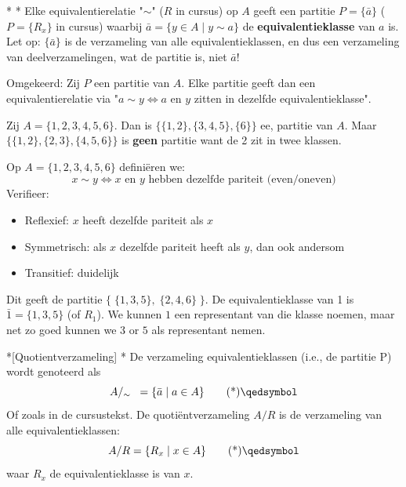 
\begin{nicetheorem}* \label{theorem:ER_naar_E_klassen}
    \nextpart[]*
    Elke equivalentierelatie "$\sim$" ($R$ in cursus) op $A$ geeft een partitie $P=\{\bar{a}\}$ ($P=\{R_x\}$ in cursus) waarbij $\bar{a} = \{y \in A \mid y \sim a\}$ de \textcolor{red!66!black}{\textbf{equivalentieklasse}} van $a$ is. Let op: $\{\bar{a}\}$ is de verzameling van alle equivalentieklassen, en dus een verzameling van deelverzamelingen, wat de partitie is, niet $\bar{a}$!
    
    \vspace{0.5cm}

    Omgekeerd: Zij $P$ een partitie van $A$. Elke partitie geeft dan een equivalentierelatie via "$a \sim y \Leftrightarrow a$ en $y$ zitten in dezelfde equivalentieklasse".
\end{nicetheorem}

\textbf{} Zij $A = \{1,2,3,4,5,6\}$. Dan is $\{\{1, 2\}, \{3,4,5\}, \{6\}\}$ ee, partitie van $A$. Maar \newline $\{\{1,2\}, \{2,3\}, \{4,5,6\}\}$ is \textbf{geen} partitie want de 2 zit in twee klassen.

\textbf{} Op $A = \{1,2,3,4,5,6\}$ definiëren we:
\begin{equation*}
    x \sim y \Leftrightarrow x \text{ en } y \text{ hebben dezelfde pariteit (even/oneven)}
\end{equation*}
Verifieer:
\begin{itemize}
    \item Reflexief: $x$ heeft dezelfde pariteit als $x$  
    \item Symmetrisch: als $x$ dezelfde pariteit heeft als $y$, dan ook andersom 
    \item Transitief: duidelijk 
\end{itemize}
Dit geeft de partitie $\{\;\{1,3,5\}, \;\{2,4,6\}\;\}$. De equivalentieklasse van 1 is $\bar{1} = \{1,3,5\}$ (of $R_1$). We kunnen $1$ een representant van die klasse noemen, maar net zo goed kunnen we $3$ or $5$ als representant nemen.


\begin{nicedefinition}*[Quotientverzameling]
    \nextpart[]*
    De verzameling equivalentieklassen (i.e., de partitie P) wordt genoteerd als
    \begin{equation}
        A/_{\sim} \;\;= \{\bar{a} \mid a \in A\} \qedtag
    \end{equation}
    Of zoals in de cursustekst. De quotiëntverzameling $A/R$ is de verzameling van alle equivalentieklassen:
    \begin{equation}
        A/R = \{R_x \mid x \in A\} \qedtag
    \end{equation}
    waar $R_x$ de equivalentieklasse is van $x$.
\end{nicedefinition}

